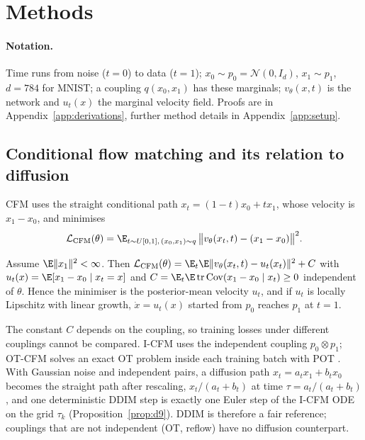\section{Methods}

\paragraph{Notation.} Time runs from noise ($t=0$) to data ($t=1$); $x_0\sim p_0=\mathcal N(0,I_d)$, $x_1\sim p_1$, $d=784$ for MNIST; a coupling $q(x_0,x_1)$ has these marginals; $v_\theta(x,t)$ is the network and $u_t(x)$ the marginal velocity field. Proofs are in Appendix~\ref{app:derivations}, further method details in Appendix~\ref{app:setup}.

\subsection{Conditional flow matching and its relation to diffusion}\label{sec:cfm}
CFM uses the straight conditional path $x_t=(1-t)x_0+tx_1$, whose velocity is $x_1-x_0$, and minimises
\begin{equation}\label{eq:cfm}
\mathcal L_{\mathrm{CFM}}(\theta)=\E_{t\sim U[0,1],\,(x_0,x_1)\sim q}\,\big\|v_\theta(x_t,t)-(x_1-x_0)\big\|^2 .
\end{equation}
\begin{proposition}\label{prop:cfm}
Assume $\E\|x_1\|^2<\infty$. Then $\mathcal L_{\mathrm{CFM}}(\theta)=\E_t\E\|v_\theta(x_t,t)-u_t(x_t)\|^2+C$ with $u_t(x)=\E[x_1-x_0\mid x_t=x]$ and $C=\E_t\E\operatorname{tr}\operatorname{Cov}(x_1-x_0\mid x_t)\ge0$ independent of $\theta$. Hence the minimiser is the posterior-mean velocity $u_t$, and if $u_t$ is locally Lipschitz with linear growth, $\dot x=u_t(x)$ started from $p_0$ reaches $p_1$ at $t=1$.
\end{proposition}
The constant $C$ depends on the coupling, so training losses under different couplings cannot be compared. I-CFM uses the independent coupling $p_0\otimes p_1$; OT-CFM solves an exact OT problem \citep{villani2009ot} inside each training batch with POT \citep{flamary2021pot}. With Gaussian noise and independent pairs, a diffusion path $x_t=a_tx_1+b_tx_0$ becomes the straight path after rescaling, $x_t/(a_t+b_t)$ at time $\tau=a_t/(a_t+b_t)$, and one deterministic DDIM step is exactly one Euler step of the I-CFM ODE on the grid $\tau_k$ (Proposition~\ref{prop:d9}). DDIM is therefore a fair reference; couplings that are not independent (OT, reflow) have no diffusion counterpart.


